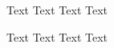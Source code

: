
\begin{minipage}{.5\textwidth}
      Text Text Text Text
\end{minipage}
\begin{minipage}{.5\textwidth}
      Text Text Text Text
\end{minipage}